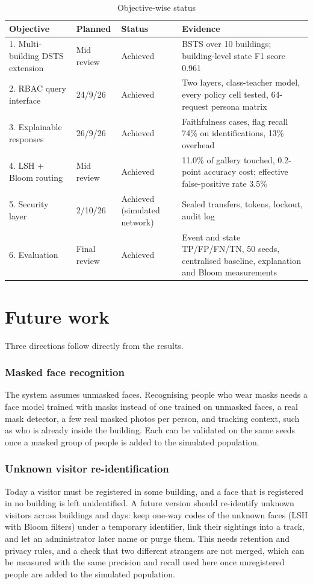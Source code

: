 \documentclass[12pt,a4paper,oneside]{report}
\begin{document}
\begin{table}[htbp]
\centering
\caption{Objective-wise status}\label{tab:status}
{\small\setlength{\tabcolsep}{4pt}\renewcommand{\arraystretch}{1.2}
\begin{tabular}{|p{4.3cm}|p{2.0cm}|p{2.6cm}|p{5.0cm}|}\hline
\textbf{Objective} & \textbf{Planned} & \textbf{Status} & \textbf{Evidence}\\\hline
1. Multi-building DSTS extension & Mid review & Achieved & BSTS over 10 buildings; building-level state F1 score 0.961\\\hline
2. RBAC query interface & 24/9/26 & Achieved & Two layers, class-teacher model, every policy cell tested, 64-request persona matrix\\\hline
3. Explainable responses & 26/9/26 & Achieved & Faithfulness cases, flag recall 74\% on identifications, 13\% overhead\\\hline
4. LSH + Bloom routing & Mid review & Achieved & 11.0\% of gallery touched, 0.2-point accuracy cost; effective false-positive rate 3.5\%\\\hline
5. Security layer & 2/10/26 & Achieved (simulated network) & Sealed transfers, tokens, lockout, audit log\\\hline
6. Evaluation & Final review & Achieved & Event and state TP/FP/FN/TN, 50 seeds, centralised baseline, explanation and Bloom measurements\\\hline
\end{tabular}}
\end{table}

\section{Future work}
Three directions follow directly from the results.

\subsubsection{Masked face recognition}
The system assumes unmasked faces. Recognising people who wear masks needs a face model trained with masks instead of one trained on unmasked faces, a real mask detector, a few real masked photos per person, and tracking context, such as who is already inside the building. Each can be validated on the same seeds once a masked group of people is added to the simulated population.

\subsubsection{Unknown visitor re-identification}
Today a visitor must be registered in some building, and a face that is registered in no building is left unidentified. A future version should re-identify unknown visitors across buildings and days: keep one-way codes of the unknown faces (LSH with Bloom filters) under a temporary identifier, link their sightings into a track, and let an administrator later name or purge them. This needs retention and privacy rules, and a check that two different strangers are not merged, which can be measured with the same precision and recall used here once unregistered people are added to the simulated population.
\end{document}
